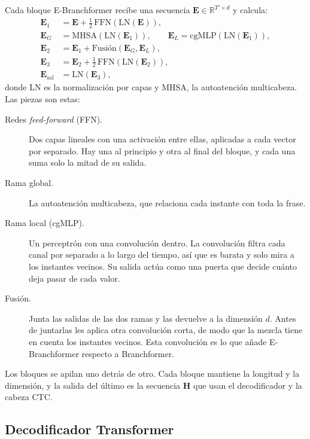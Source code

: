 Cada bloque E-Branchformer recibe una secuencia $\mathbf{E} \in \mathbb{R}^{T' \times d}$ y calcula:
\begin{align}
  \mathbf{E}_1 &= \mathbf{E} + \tfrac{1}{2}\,\mathrm{FFN}(\mathrm{LN}(\mathbf{E})), \\
  \mathbf{E}_G &= \mathrm{MHSA}(\mathrm{LN}(\mathbf{E}_1)), \qquad \mathbf{E}_L = \mathrm{cgMLP}(\mathrm{LN}(\mathbf{E}_1)), \\
  \mathbf{E}_2 &= \mathbf{E}_1 + \text{Fusión}(\mathbf{E}_G, \mathbf{E}_L), \\
  \mathbf{E}_3 &= \mathbf{E}_2 + \tfrac{1}{2}\,\mathrm{FFN}(\mathrm{LN}(\mathbf{E}_2)), \\
  \mathbf{E}_{\mathrm{sal}} &= \mathrm{LN}(\mathbf{E}_3),
\end{align}
donde $\mathrm{LN}$ es la normalización por capas y $\mathrm{MHSA}$, la autoatención multicabeza. Las piezas son estas:

\begin{description}
  \item[Redes \textit{feed-forward} (FFN).] Dos capas lineales con una activación entre ellas, aplicadas a cada vector por separado. Hay una al principio y otra al final del bloque, y cada una suma solo la mitad de su salida.
  \item[Rama global.] La autoatención multicabeza, que relaciona cada instante con toda la frase.
  \item[Rama local (cgMLP).] Un perceptrón con una convolución dentro. La convolución filtra cada canal por separado a lo largo del tiempo, así que es barata y solo mira a los instantes vecinos. Su salida actúa como una puerta que decide cuánto deja pasar de cada valor.
  \item[Fusión.] Junta las salidas de las dos ramas y las devuelve a la dimensión $d$. Antes de juntarlas les aplica otra convolución corta, de modo que la mezcla tiene en cuenta los instantes vecinos. Esta convolución es lo que añade E-Branchformer respecto a Branchformer.
\end{description}

Los bloques se apilan uno detrás de otro. Cada bloque mantiene la longitud y la dimensión, y la salida del último es la secuencia $\mathbf{H}$ que usan el decodificador y la cabeza CTC.

\subsection{Decodificador Transformer}
\label{sec:decoder-teoria}

